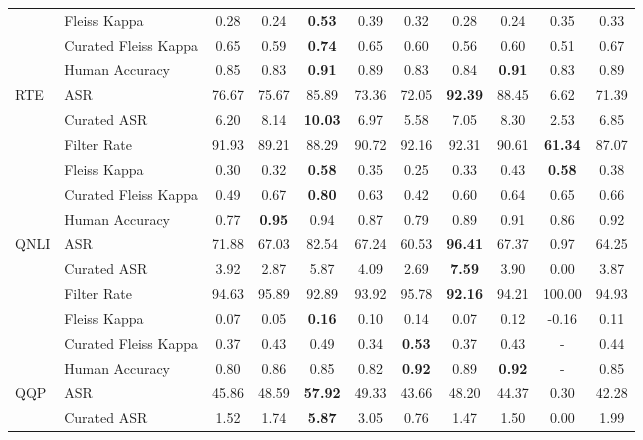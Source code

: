 \documentclass{article}
\begin{document}
\begin{table}[t]
{{\begin{tabular}{ll|cccccccc|c}
           & Fleiss Kappa   & 0.28 & 0.24 & \textbf{0.53} & 0.39 & 0.32 & 0.28 & 0.24 & 0.35 & 0.33 \\
           & Curated Fleiss Kappa   & 0.65 & 0.59 & \textbf{0.74} & 0.65 & 0.60 & 0.56 & 0.60 & 0.51 & 0.67 \\
           & Human Accuracy  & 0.85 & 0.83 & \textbf{0.91} & 0.89 & 0.83 & 0.84 & \textbf{0.91} & 0.83 & 0.89 \\
           \midrule
           \multirow{6}{*}{RTE} & ASR  & 76.67 & 75.67 & 85.89 & 73.36 & 72.05 & \textbf{92.39} & 88.45 & 6.62 & 71.39 \\
           & Curated ASR  & 6.20 & 8.14 & \textbf{10.03} & 6.97 & 5.58 & 7.05 & 8.30 & 2.53 & 6.85 \\
           & Filter Rate  & 91.93 & 89.21 & 88.29 & 90.72 & 92.16 & 92.31 & 90.61 & \textbf{61.34} & 87.07 \\
           & Fleiss Kappa   & 0.30 & 0.32 & \textbf{0.58} & 0.35 & 0.25 & 0.33 & 0.43 & \textbf{0.58} & 0.38 \\
           & Curated Fleiss Kappa   & 0.49 & 0.67 & \textbf{0.80} & 0.63 & 0.42 & 0.60 & 0.64 & 0.65 & 0.66 \\
           & Human Accuracy  & 0.77 & \textbf{0.95} & 0.94 & 0.87 & 0.79 & 0.89 & 0.91 & 0.86 & 0.92 \\
           \midrule
           \multirow{6}{*}{QNLI} & ASR  & 71.88 & 67.03 & 82.54 & 67.24 & 60.53 & \textbf{96.41} & 67.37 & {0.97} & 64.25 \\
           & Curated ASR  & 3.92 & 2.87 & 5.87 & 4.09 & 2.69 & \textbf{7.59} & 3.90 & 0.00 & 3.87 \\
           & Filter Rate  & 94.63 & 95.89 & 92.89 & 93.92 & 95.78 & \textbf{92.16} & 94.21 & 100.00 & 94.93 \\
           & Fleiss Kappa   & 0.07 & 0.05 & \textbf{0.16} & 0.10 & 0.14 & 0.07 & 0.12 & -0.16 & 0.11 \\
           & Curated Fleiss Kappa   & 0.37 & 0.43 & 0.49 & 0.34 & \textbf{0.53} & 0.37 & 0.43 & - & 0.44 \\
           & Human Accuracy  & 0.80 & 0.86 & 0.85 & 0.82 & \textbf{0.92} & 0.89 & \textbf{0.92} & - & 0.85 \\
           \midrule
           \multirow{6}{*}{QQP} & ASR  & 45.86 & 48.59 & \textbf{57.92} & 49.33 & 43.66 & 48.20 & 44.37 & 0.30 & 42.28 \\
           & Curated ASR  & 1.52 & 1.74 & \textbf{5.87} & 3.05 & 0.76 & 1.47 & 1.50 & 0.00 & 1.99 \\

\end{tabular}}}
\end{table}
\end{document}
